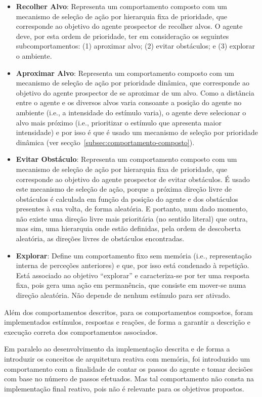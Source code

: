 \begin{itemize}
    \item \textbf{Recolher Alvo}: Representa um comportamento composto com um mecanismo de seleção de ação por hierarquia fixa de prioridade, que corresponde ao objetivo do agente prospector de recolher alvos.
    O agente deve, por esta ordem de prioridade, ter em consideração os seguintes subcomportamentos: (1) aproximar alvo; (2) evitar obstáculos; e (3) explorar o ambiente.
    \item \textbf{Aproximar Alvo}: Representa um comportamento composto com um mecanismo de seleção de ação por prioridade dinâmica, que corresponde ao objetivo do agente prospector de se aproximar de um alvo.
    Como a distância entre o agente e os diversos alvos varia consoante a posição do agente no ambiente (i.e., a intensidade do estímulo varia), o agente deve selecionar o alvo mais próximo (i.e., prioritizar o estímulo que apresenta maior intensidade) e por isso é que é usado um mecanismo de seleção por prioridade dinâmica (ver secção~\ref{subsec:comportamento-composto}).
    \item \textbf{Evitar Obstáculo}: Representa um comportamento composto com um mecanismo de seleção de ação por hierarquia fixa de prioridade, que corresponde ao objetivo do agente prospector de evitar obstáculos.
    É usado este mecanismo de seleção de ação, porque a próxima direção livre de obstáculos é calculada em função da posição do agente e dos obstáculos presentes à sua volta, de forma aleatória.
    E portanto, num dado momento, não existe uma direção livre mais prioritária (no sentido literal) que outra, mas sim, uma hierarquia onde estão definidas, pela ordem de descoberta aleatória, as direções livres de obstáculos encontradas.
    \item \textbf{Explorar}: Define um comportamento fixo sem memória (i.e., representação interna de perceções anteriores) e que, por isso está condenado à repetição. Está associado ao objetivo ``explorar'' e caracteriza-se por ter uma resposta fixa, pois gera uma ação em permanência, que consiste em mover-se numa direção aleatória. Não depende de nenhum estímulo para ser ativado.
\end{itemize}

Além dos comportamentos descritos, para os comportamentos compostos, foram implementados estímulos, respostas e reações, de forma a garantir a descrição e execução correta dos comportamentos associados.

Em paralelo ao desenvolvimento da implementação descrita e de forma a introduzir os conceitos de arquitetura reativa com memória, foi introduzido um comportamento com a finalidade de contar os passos do agente e tomar decisões com base no número de passos efetuados.
Mas tal comportamento não consta na implementação final reativo, pois não é relevante para os objetivos propostos.


